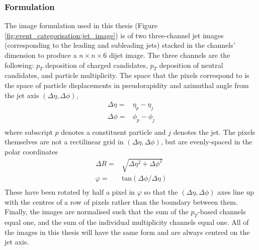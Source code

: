 \subsubsection{Formulation}
The image formulation used in this thesis (Figure \ref{fig:event_categorisation:jet_image}) is of two three-channel jet images (corresponding to the leading and subleading jets) stacked in the channels' dimension to produce a $n\times{}n\times{}6$ dijet image.
The three channels are the following: $p_T$ deposition of charged candidates, $p_T$ deposition of neutral candidates, and particle multiplicity.
The space that the pixels correspond to is the space of particle displacements in pseudorapidity and azimuthal angle from the jet axis $(\Delta\eta,\Delta\phi)$,
\begin{equation}
    \begin{split}
        \Delta\eta =& \eta_{p} - \eta_{j} \\ 
        \Delta\phi =& \phi_{p} - \phi_{j} \\
    \end{split}
    \label{eq:event_categorisation:pixel_coords}
\end{equation}
where subscript $p$ denotes a constituent particle and $j$ denotes the jet. 
The pixels themselves are not a rectilinear grid in $(\Delta\eta,\Delta\phi)$, but are evenly-spaced in the polar coordinates 
\begin{equation}
    \begin{split}
        \Delta{R} =& \sqrt{\Delta\eta^2 + \Delta\phi^2} \\
        \varphi   =& \mathrm{tan}(\Delta\phi/\Delta\eta) \\
    \end{split}
    \label{eq:event_categorisation:pixel_coords}
\end{equation}
These have been rotated by half a pixel in $\varphi$ so that the $(\Delta\eta,\Delta\phi)$ axes line up with the centres of a row of pixels rather than the boundary between them. 
Finally, the images are normalised such that the sum of the $p_T$-based channels equal one, and the sum of the individual multiplicity channels equal one. 
All of the images in this thesis will have the same form and are always centred on the jet axis.

